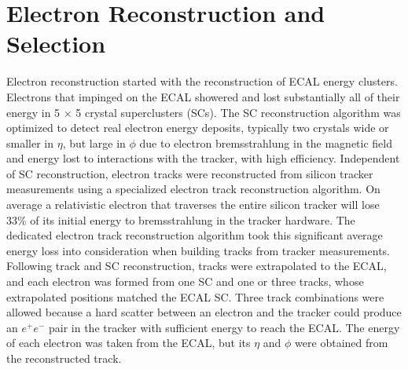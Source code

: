\section{Electron Reconstruction and Selection}
\label{sec:electronRecoAndSelection}
Electron reconstruction started with the reconstruction of ECAL energy clusters.  Electrons that impinged 
on the ECAL showered and lost substantially all of their energy in 5 $\times$ 5 crystal superclusters (SCs).  
The SC reconstruction algorithm was optimized to detect real electron energy deposits, typically two crystals 
wide or smaller in $\eta$, but large in $\phi$ due to electron bremsstrahlung in the magnetic field and energy 
lost to interactions with the tracker, with high efficiency.  Independent of SC reconstruction, electron 
tracks were reconstructed from silicon tracker measurements using a specialized electron track reconstruction 
algorithm.  On average a relativistic electron that traverses the entire silicon tracker will lose 33\% of 
its initial energy to bremsstrahlung in the tracker hardware.  The dedicated electron track reconstruction 
algorithm took this significant average energy loss into consideration when building tracks from tracker 
measurements.  Following track and SC reconstruction, tracks were extrapolated to the ECAL, and each electron 
was formed from one SC and one or three tracks, whose extrapolated positions matched the ECAL SC.  Three track 
combinations were allowed because a hard scatter between an electron and the tracker could produce an $e^{+}e^{-}$ 
pair in the tracker with sufficient energy to reach the ECAL.  The energy of each electron was taken from 
the ECAL, but its $\eta$ and $\phi$ were obtained from the reconstructed track.



